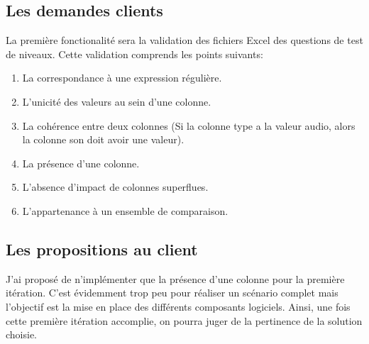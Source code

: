 \subsection{Les demandes clients}
\label{subsec:customer-requests}

    La première fonctionalité sera la validation des fichiers Excel des questions de test de niveaux.
    Cette validation comprends les points suivants:
    \begin{enumerate}
        \item La correspondance à une expression régulière.
        \item L'unicité des valeurs au sein d'une colonne.
        \item La cohérence entre deux colonnes (Si la colonne type a la valeur audio, alors la colonne son doit avoir une valeur).
        \item La présence d'une colonne.
        \item L'absence d'impact de colonnes superflues.
        \item L'appartenance à un ensemble de comparaison.
    \end{enumerate}

\subsection{Les propositions au client}
\label{subsec:proposals-to-customer}

    J'ai proposé de n'implémenter que la présence d'une colonne pour la première itération.
    C'est évidemment trop peu pour réaliser un scénario complet mais l'objectif est la mise en place des différents composants logiciels.
    Ainsi, une fois cette première itération accomplie, on pourra juger de la pertinence de la solution choisie.
